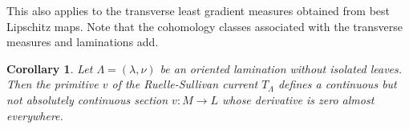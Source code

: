 \documentclass{ip-journal}
\newtheorem{lemma}[theorem]{Lemma}
\newtheorem{corollary}[theorem]{Corollary}
\theoremstyle{definition}
\numberwithin{equation}{section}
\begin{document}

 
 This also applies to the transverse least gradient measures obtained from best Lipschitz maps. Note that the cohomology classes associated with the transverse measures and laminations add.


 
\begin{corollary} Let $\Lambda=(\lambda, \nu)$ be an oriented lamination without isolated leaves. Then the primitive $v$ of the Ruelle-Sullivan current $T_\Lambda$ defines a continuous but not absolutely continuous section $v: M \rightarrow L$ whose derivative is zero almost everywhere.
\end{corollary}
\end{document}
